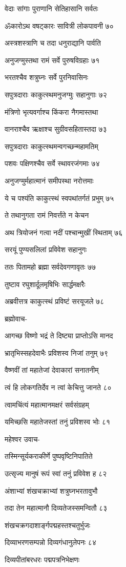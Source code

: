 वेदाः सांगाः पुराणानि सेतिहासानि सर्वतः

ॐकारोऽथ वषट्कारः सावित्री लोकपावनी ७०

अस्त्रशस्त्राणि च तदा धनुराद्यानि पार्वति

अनुजग्मुस्तथा रामं सर्वे पुरुषविग्रहाः ७१

भरतश्चैव शत्रुघ्नः सर्वे पुरनिवासिनः

सपुत्रदाराः काकुत्स्थमनुजग्मुः सहानुगाः ७२

मंत्रिणो भृत्यवर्गाश्च किंकरा नैगमास्तथा

वानराश्चैव ऋक्षाश्च सुग्रीवसहितास्तदा ७३

सपुत्रदाराः काकुत्स्थमन्वगच्छन्महामतिम्

पशवः पक्षिणश्चैव सर्वे स्थावरजंगमाः ७४

अनुजग्मुर्महात्मानं समीपस्था नरोत्तमाः

ये च पश्यंति काकुत्स्थं स्वपथांतर्गतं प्रभुम् ७५

ते तथानुगता रामं निवर्त्तंते न केचन

अथ त्रियोजनं गत्वा नदीं पश्चान्मुखीं स्थिताम् ७६

सरयूं पुण्यसलिलां प्रविवेश सहानुगः

ततः पितामहो ब्रह्मा सर्वदेवगणावृतः ७७

तुष्टाव रघुशार्दूलमृषिभिः सार्द्धमक्षरैः

अब्रवीत्तत्र काकुत्स्थं प्रविष्टं सरयूजले ७८

ब्रह्मोवाच-

आगच्छ विष्णो भद्रं ते दिष्ट्या प्राप्तोऽसि मानद

भ्रातृभिस्सहदेवाभैः प्रविशस्व निजां तनुम् ७९

वैष्णवीं तां महातेजां देवाकारां सनातनीम्

त्वं हि लोकगतिर्देव न त्वां केचित्तु जानते ८०

त्वामचिंत्यं महात्मानमक्षरं सर्वसंग्रहम्

यमिच्छसि महातेजस्तां तनुं प्रविशस्व भोः ८१

महेश्वर उवाच-

तस्मिन्सूर्यकराकीर्णे पुष्पवृष्टिनिपातिते

उत्सृज्य मानुषं रूपं स्वां तनुं प्रविवेश ह ८२

अंशाभ्यां शंखचक्राभ्यां शत्रुघ्नभरतावुभौ

तदा तेन महात्मानौ दिव्यतेजस्समन्वितौ ८३

शंखचक्रगदाशार्ङ्गपद्महस्तश्चतुर्भुजः

दिव्याभरणसम्पन्नो दिव्यगंधानुलेपनः ८४

दिव्यपीतांबरधरः पद्मपत्रनिभेक्षणः

